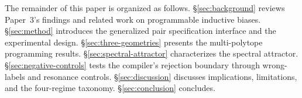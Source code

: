 The remainder of this paper is organized as follows.
\S\ref{sec:background} reviews Paper~3's findings and related work on
programmable inductive biases. \S\ref{sec:method} introduces the
generalized pair specification interface and the experimental design.
\S\ref{sec:three-geometries} presents the multi-polytope programming
results. \S\ref{sec:spectral-attractor} characterizes the spectral
attractor. \S\ref{sec:negative-controls} tests the compiler's rejection
boundary through wrong-labels and resonance controls.
\S\ref{sec:discussion} discusses implications, limitations, and the
four-regime taxonomy. \S\ref{sec:conclusion} concludes.
